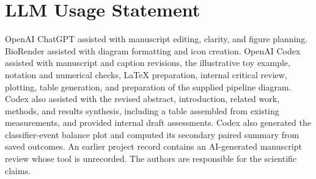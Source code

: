 \section*{LLM Usage Statement}
OpenAI ChatGPT assisted with manuscript editing, clarity, and figure planning.
BioRender assisted with diagram formatting and icon creation.
OpenAI Codex assisted with manuscript and caption revisions, the illustrative
toy example, notation and numerical checks, LaTeX preparation, internal
critical review, plotting, table generation, and preparation of the supplied
pipeline diagram. Codex also assisted with the revised abstract, introduction, related work,
methods, and results synthesis, including a table assembled from existing
measurements, and provided internal draft assessments. Codex also generated the
classifier-event balance plot and computed its secondary paired summary
from saved outcomes. An earlier project record contains an AI-generated manuscript review whose
tool is unrecorded. The authors are responsible for the scientific claims.
